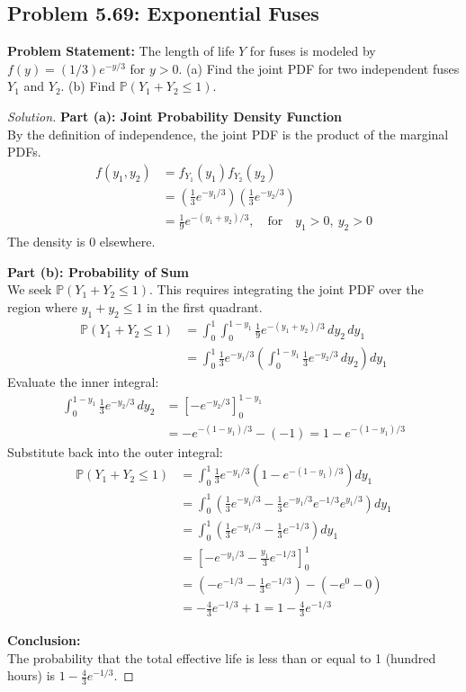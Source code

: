 \documentclass[11pt, a4paper]{article}
\theoremstyle{definition}
\theoremstyle{remark}
\newcommand{\Prob}{\mathbb{P}}
\begin{document}
\subsection{Problem 5.69: Exponential Fuses}
\textbf{Problem Statement:} The length of life $Y$ for fuses is modeled by $f(y) = (1/3)e^{-y/3}$ for $y > 0$. 
(a) Find the joint PDF for two independent fuses $Y_1$ and $Y_2$. 
(b) Find $\Prob(Y_1 + Y_2 \leq 1)$.

\begin{proof}[Solution]
\textbf{Part (a): Joint Probability Density Function}\\
By the definition of independence, the joint PDF is the product of the marginal PDFs.
\begin{align*}
f(y_1, y_2) &= f_{Y_1}(y_1) f_{Y_2}(y_2) \\
&= \left( \frac{1}{3}e^{-y_1/3} \right) \left( \frac{1}{3}e^{-y_2/3} \right) \\
&= \frac{1}{9} e^{-(y_1 + y_2)/3}, \quad \text{for} \quad y_1 > 0, \ y_2 > 0
\end{align*}
The density is $0$ elsewhere.

\textbf{Part (b): Probability of Sum}\\
We seek $\Prob(Y_1 + Y_2 \leq 1)$. This requires integrating the joint PDF over the region where $y_1 + y_2 \leq 1$ in the first quadrant.
\begin{align*}
\Prob(Y_1 + Y_2 \leq 1) &= \int_{0}^{1} \int_{0}^{1 - y_1} \frac{1}{9} e^{-(y_1 + y_2)/3} \, dy_2 \, dy_1 \\
&= \int_{0}^{1} \frac{1}{3} e^{-y_1/3} \left( \int_{0}^{1 - y_1} \frac{1}{3} e^{-y_2/3} \, dy_2 \right) dy_1
\end{align*}
Evaluate the inner integral:
\begin{align*}
\int_{0}^{1 - y_1} \frac{1}{3} e^{-y_2/3} \, dy_2 &= \left[ -e^{-y_2/3} \right]_{0}^{1 - y_1} \\
&= -e^{-(1 - y_1)/3} - (-1) = 1 - e^{-(1 - y_1)/3}
\end{align*}
Substitute back into the outer integral:
\begin{align*}
\Prob(Y_1 + Y_2 \leq 1) &= \int_{0}^{1} \frac{1}{3} e^{-y_1/3} \left( 1 - e^{-(1 - y_1)/3} \right) dy_1 \\
&= \int_{0}^{1} \left( \frac{1}{3} e^{-y_1/3} - \frac{1}{3} e^{-y_1/3} e^{-1/3} e^{y_1/3} \right) dy_1 \\
&= \int_{0}^{1} \left( \frac{1}{3} e^{-y_1/3} - \frac{1}{3} e^{-1/3} \right) dy_1 \\
&= \left[ -e^{-y_1/3} - \frac{y_1}{3} e^{-1/3} \right]_{0}^{1} \\
&= \left( -e^{-1/3} - \frac{1}{3} e^{-1/3} \right) - \left( -e^{0} - 0 \right) \\
&= -\frac{4}{3} e^{-1/3} + 1 = 1 - \frac{4}{3} e^{-1/3}
\end{align*}

\textbf{Conclusion:}\\
The probability that the total effective life is less than or equal to 1 (hundred hours) is $1 - \frac{4}{3} e^{-1/3}$.
\end{proof}
\end{document}

